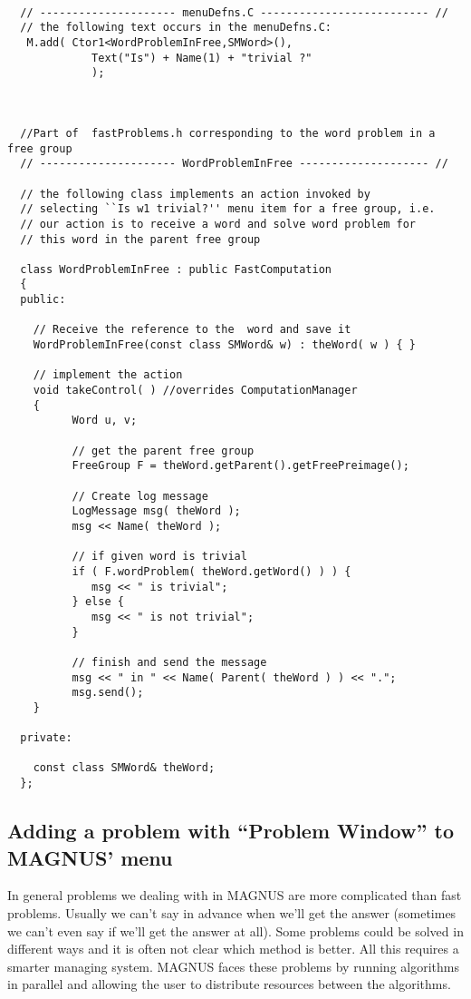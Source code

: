 \documentclass[12pt]{article}
\def\magnus{MAGNUS }
\def\nsmagnus{MAGNUS}
\begin{document}
  \scriptsize
  \begin{verbatim}

  // --------------------- menuDefns.C -------------------------- //
  // the following text occurs in the menuDefns.C:
   M.add( Ctor1<WordProblemInFree,SMWord>(),
             Text("Is") + Name(1) + "trivial ?" 
             );



  //Part of  fastProblems.h corresponding to the word problem in a free group
  // --------------------- WordProblemInFree -------------------- //

  // the following class implements an action invoked by
  // selecting ``Is w1 trivial?'' menu item for a free group, i.e.
  // our action is to receive a word and solve word problem for 
  // this word in the parent free group

  class WordProblemInFree : public FastComputation
  {
  public:

    // Receive the reference to the  word and save it
    WordProblemInFree(const class SMWord& w) : theWord( w ) { }

    // implement the action
    void takeControl( ) //overrides ComputationManager
    {
          Word u, v;

          // get the parent free group
          FreeGroup F = theWord.getParent().getFreePreimage();

          // Create log message
          LogMessage msg( theWord );
          msg << Name( theWord );

          // if given word is trivial
          if ( F.wordProblem( theWord.getWord() ) ) {
             msg << " is trivial";
          } else {
             msg << " is not trivial";
          }

          // finish and send the message
          msg << " in " << Name( Parent( theWord ) ) << ".";
          msg.send();
    }
    
  private:

    const class SMWord& theWord;
  };
  \end{verbatim}
  \normalsize
 
  \subsection{Adding a problem with ``Problem Window'' to \nsmagnus' menu}

  In general problems we dealing with in \magnus are more complicated than
  fast problems. Usually we can't say 
  in advance when we'll get the answer (sometimes we can't even say if we'll get
   the answer at all). Some problems could be solved in different ways and it is 
  often 
  not clear which method is better. All this requires a smarter managing system. 
  \magnus
  faces these problems by running algorithms in parallel and allowing the user to 
  distribute resources between the algorithms. 
\end{document}
